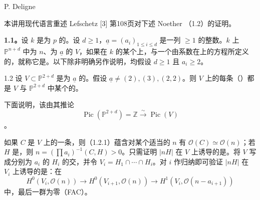 \begin{center}P. Deligne\end{center}

本讲用现代语言重述 Lefschetz [3] 第108页对下述 Noether （1.2）的证明。

\textbf{1.1。}设 $k$ 是为 $p$ 的。设 $d\geq1$，$\underline a=(a_i)_{1\leq i\leq d}$ 是一列 $\geq1$ 的整数。$k$ 上 $\mathbb P^{n+d}$ 中为 $n$、为 $\underline a$ 的 $V$，如果在 $k$ 的某个上，与一个由系数在上的方程所定义的，就称它是。以下除非明确另作说明，均假设 $d\geq1$ 且 $a_i\geq2$。

\begin{SGAresult}{}{1.2}
设 $V\subset\mathbb P^{2+d}$ 是为 $\underline a$ 的。假设 $\underline a\ne(2),(3),(2,2)$。则 $V$ 上的每条（）都是 $V$ 与 $\mathbb P^{2+d}$ 中某个的。
\end{SGAresult}
下面说明，该由其推论
\begin{equation}
\operatorname{Pic}(\mathbb P^{2+d})=\mathbb Z\xrightarrow{\sim}\operatorname{Pic}(V)
\tag{1.2.1}
\end{equation}
。

如果 $C$ 是 $V$ 上的一条，则（1.2.1）蕴含对某个适当的 $n$ 有 $\mathcal O(C)\simeq\mathcal O(n)$；若 $H$ 是，则 $n=(\prod a_i)^{-1}(C,H)>0$。只需证明 $|nH|$ 在 $V$ 上诱导的是。将 $V$ 写成分别为 $a_i$ 的 $H_i$ 的交，并令 $V_i=H_1\cap\cdots\cap H_i$。对 $i$ 作归纳即可验证 $|nH|$ 在 $V_i$ 上诱导的是：在
\[
H^0(V_i,\mathcal O(n))\longrightarrow H^0(V_{i+1},\mathcal O(n))
\longrightarrow H^1(V_i,\mathcal O(n-a_{i+1}))
\]
中，最后一群为零（FAC）。

